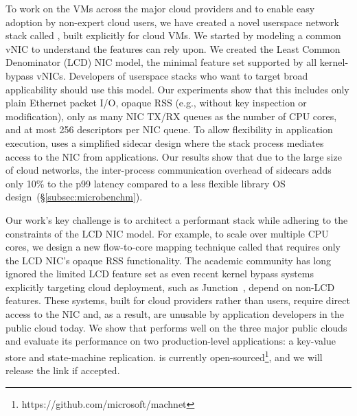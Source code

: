 To work on the VMs across the major cloud providers and to enable easy adoption by non-expert cloud users, we have created a novel userspace network stack called \mt{}, built explicitly for cloud VMs.
We started by modeling a common vNIC to understand the features \mt{} can rely upon.
We created the Least Common Denominator (LCD) NIC model, the minimal feature set supported by all kernel-bypass vNICs.
Developers of userspace stacks who want to target broad applicability should use this model.
Our experiments show that this includes only plain Ethernet packet I/O, opaque RSS (e.g., without key inspection or modification), only as many NIC TX/RX queues as the number of CPU cores, and at most 256 descriptors per NIC queue.
To allow flexibility in application execution, \mt{} uses a simplified sidecar design where the stack process mediates access to the NIC from applications.
Our results show that due to the large size of cloud networks, the inter-process communication overhead of sidecars adds only 10\% to the p99 latency compared to a less flexible library OS design~(\S\ref{subsec:microbenchm}).

Our work's key challenge is to architect a performant stack while adhering to the constraints of the LCD NIC model.
For example, to scale \mt{} over multiple CPU cores, we design a new flow-to-core mapping technique called \rssminus{} that requires only the LCD NIC's opaque RSS functionality.
The academic community has long ignored the limited LCD feature set as even recent kernel bypass systems explicitly targeting cloud deployment, such as Junction~\cite{junction:nsdi24}, depend on non-LCD features.
These systems, built for cloud providers rather than users, require direct access to the NIC and, as a result, are unusable by application developers in the public cloud today.
We show that \mt{} performs well on the three major public clouds and evaluate its performance on two production-level applications: a key-value store and state-machine replication. \mt{} is currently open-sourced\footnote{https://github.com/microsoft/machnet}, and we will release the link if accepted.

